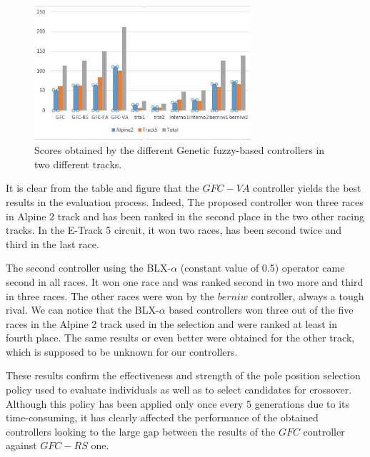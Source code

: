 \documentclass[conference]{IEEEtran}
\begin{document}
\begin{figure}[!ht]	
	\begin{center}
		\includegraphics[width=8cm]{fig/gfc_races.jpg}
		\caption{Scores obtained by the different Genetic fuzzy-based controllers in two different tracks.}
		\label{fig:gfc_races}
	\end{center}
\end{figure}

It is clear from the table and figure that the $GFC-VA$ controller
yields the best results in the evaluation process. Indeed, The
proposed controller won three races in Alpine 2 track and has been
ranked in the second place in the two other racing tracks. In the E-Track 5
circuit, it won two races, has been second twice and third in
the last race.

The second controller using the BLX-$\alpha$ (constant value of 0.5)
operator came second in all races. It won one race and was ranked
second in two more and third in three races.
The other races were won by the $berniw$ controller, always a tough rival.
We can notice that the BLX-$\alpha$ based controllers won three out of the five races in the Alpine 2 track used in the selection and were ranked at least in fourth place.
The same results or even  better were obtained for the other track, which is supposed to be unknown for our controllers.

These results confirm the effectiveness and strength of the pole position selection policy used to evaluate individuals as well as to select candidates for crossover. Although this policy has been applied only once every 5 generations due to its time-consuming, it has clearly affected the performance of the obtained controllers looking to the large gap between the results of the $GFC$ controller against $GFC-RS$ one.
\end{document}
